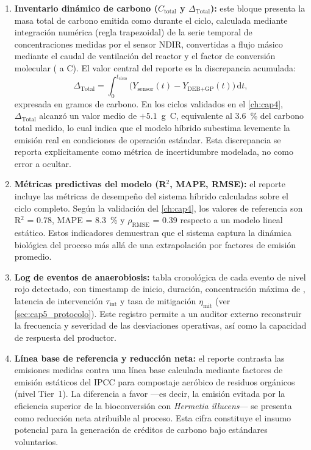 \begin{enumerate}
    \item \textbf{Inventario dinámico de carbono ($C_{\text{total}}$ y $\Delta_{\text{Total}}$):} este bloque presenta la masa total de carbono emitida como  durante el ciclo, calculada mediante integración numérica (regla trapezoidal) de la serie temporal de concentraciones medidas por el sensor NDIR, convertidas a flujo másico mediante el caudal de ventilación del reactor y el factor de conversión molecular ( a C). El valor central del reporte es la discrepancia acumulada:
    \begin{equation}
        \Delta_{\text{Total}} = \int_{0}^{t_{\text{ciclo}}} \bigl( Y_{\text{sensor}}(t) - Y_{\text{DEB+GP}}(t) \bigr) \, \mathrm{d}t,
        \label{eq:delta_total_reporte}
    \end{equation}
    expresada en gramos de carbono. En los ciclos validados en el \cref{ch:cap4}, $\Delta_{\text{Total}}$ alcanzó un valor medio de $+\num{5.1}$~g~C, equivalente al \num{3.6}~\% del carbono total medido, lo cual indica que el modelo híbrido subestima levemente la emisión real en condiciones de operación estándar. Esta discrepancia se reporta explícitamente como métrica de incertidumbre modelada, no como error a ocultar.
    
    \item \textbf{Métricas predictivas del modelo (R$^2$, MAPE, RMSE):} el reporte incluye las métricas de desempeño del sistema híbrido calculadas sobre el ciclo completo. Según la validación del \cref{ch:cap4}, los valores de referencia son R$^2$ = \num{0.78}, MAPE = \num{8.3}~\% y $\rho_{\text{RMSE}}$ = \num{0.39} respecto a un modelo lineal estático. Estos indicadores demuestran que el sistema captura la dinámica biológica del proceso más allá de una extrapolación por factores de emisión promedio.
    
    \item \textbf{Log de eventos de anaerobiosis:} tabla cronológica de cada evento de nivel rojo detectado, con timestamp de inicio, duración, concentración máxima de , latencia de intervención $\tau_{\text{int}}$ y tasa de mitigación $\eta_{\text{mit}}$ (ver \cref{sec:cap5_protocolo}). Este registro permite a un auditor externo reconstruir la frecuencia y severidad de las desviaciones operativas, así como la capacidad de respuesta del productor.
    
    \item \textbf{Línea base de referencia y reducción neta:} el reporte contrasta las emisiones medidas contra una línea base calculada mediante factores de emisión estáticos del IPCC para compostaje aeróbico de residuos orgánicos (nivel Tier~1). La diferencia a favor —es decir, la emisión evitada por la eficiencia superior de la bioconversión con \textit{Hermetia illucens}— se presenta como reducción neta atribuible al proceso. Esta cifra constituye el insumo potencial para la generación de créditos de carbono bajo estándares voluntarios.
    

\end{enumerate}
